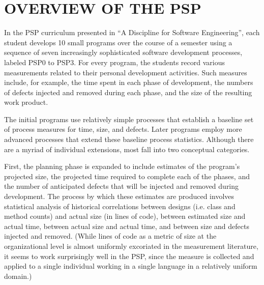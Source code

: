 
\section{OVERVIEW OF THE PSP}


In the PSP curriculum presented in ``A Discipline for Software
Engineering'', each student develops 10 small programs over the course of a
semester using a sequence of seven increasingly sophisticated software
development processes, labeled PSP0 to PSP3.  For every program, the students record various
measurements related to their personal development activities. Such
measures include, for example, the time spent in each phase of development,
the numbers of defects injected and removed during each phase, and the size
of the resulting work product.

The initial programs use relatively simple processes that establish a
baseline set of process measures for time, size, and defects. Later
programs employ more advanced processes that extend these baseline
process statistics.  Although there are a myriad of individual extensions, 
most fall into two conceptual categories.

First, the planning phase is expanded to include estimates of the program's
projected size, the projected time required to complete each of the phases,
and the number of anticipated defects that will be injected and removed
during development.  The process by which these estimates are produced
involves statistical analysis of historical correlations between designs
(i.e. class and method counts) and actual size (in lines of code), between
estimated size and actual time, between actual size and actual time, and
between size and defects injected and removed.  (While lines of code as a
metric of size at the organizational level is almost uniformly excoriated
in the measurement literature, it seems to work surprisingly well in the
PSP, since the measure is collected and applied to a single individual working
in a single language in a relatively uniform domain.)


